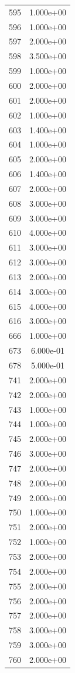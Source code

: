 \documentclass[12pt]{article}
\begin{document}
\begin{longtable}{@{}cc@{}}
595 & 1.000e+00 \\
596 & 1.000e+00 \\
597 & 2.000e+00 \\
598 & 3.500e+00 \\
599 & 1.000e+00 \\
600 & 2.000e+00 \\
601 & 2.000e+00 \\
602 & 1.000e+00 \\
603 & 1.400e+00 \\
604 & 1.000e+00 \\
605 & 2.000e+00 \\
606 & 1.400e+00 \\
607 & 2.000e+00 \\
608 & 3.000e+00 \\
609 & 3.000e+00 \\
610 & 4.000e+00 \\
611 & 3.000e+00 \\
612 & 3.000e+00 \\
613 & 2.000e+00 \\
614 & 3.000e+00 \\
615 & 4.000e+00 \\
616 & 3.000e+00 \\
666 & 1.000e+00 \\
673 & 6.000e-01 \\
678 & 5.000e-01 \\
741 & 2.000e+00 \\
742 & 2.000e+00 \\
743 & 1.000e+00 \\
744 & 1.000e+00 \\
745 & 2.000e+00 \\
746 & 3.000e+00 \\
747 & 2.000e+00 \\
748 & 2.000e+00 \\
749 & 2.000e+00 \\
750 & 1.000e+00 \\
751 & 2.000e+00 \\
752 & 1.000e+00 \\
753 & 2.000e+00 \\
754 & 2.000e+00 \\
755 & 2.000e+00 \\
756 & 2.000e+00 \\
757 & 2.000e+00 \\
758 & 3.000e+00 \\
759 & 3.000e+00 \\
760 & 2.000e+00 \\

\end{longtable}
\end{document}

